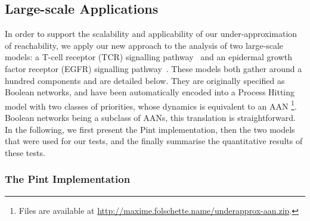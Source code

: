 \subsection{Large-scale Applications}
\label{ssec:ex-tcrsig}

In order to support the scalability and applicability of our under-approximation of reachability, we
apply our new approach to the analysis of two large-scale models:
a T-cell receptor (TCR) signalling pathway~\cite{tcrsig94}
and an epidermal growth factor receptor (EGFR) signalling pathway~\cite{Samaga2009}.
These models both gather around a hundred components and are detailed below.
They are originally specified as Boolean networks,
and have been automatically encoded into
a Process Hitting model with two classes of priorities,
whose dynamics is equivalent to an AAN%
\footnote{Files are available at
\url{http://maxime.folschette.name/underapprox-aan.zip}. }.
Boolean networks being a subclass of AANs, this translation is straightforward.
In the following, we first present the Pint implementation,
then the two models that were used for our tests,
and the finally summarise the quantitative results of these tests.

\subsubsection*{The Pint Implementation}

